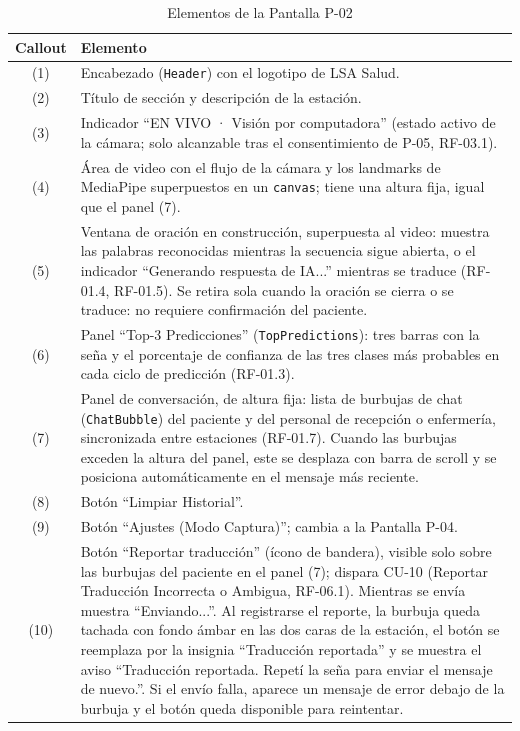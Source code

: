 \begin{table}[H]
    \centering
    \caption{Elementos de la Pantalla P-02}
    \label{tab:mock-p02}
    \begin{tabularx}{\textwidth}{c X}
        \toprule
        \textbf{Callout} & \textbf{Elemento} \\
        \midrule
        (1) & Encabezado (\texttt{Header}) con el logotipo de LSA Salud. \\
        (2) & Título de sección y descripción de la estación. \\
        (3) & Indicador ``EN VIVO · Visión por computadora'' (estado activo
        de la cámara; solo alcanzable tras el consentimiento de P-05, RF-03.1). \\
        (4) & Área de video con el flujo de la cámara y los landmarks
        de MediaPipe superpuestos en un \texttt{canvas}; tiene una altura
        fija, igual que el panel (7). \\
        (5) & Ventana de oración en construcción, superpuesta al video:
        muestra las palabras reconocidas mientras la secuencia sigue
        abierta, o el indicador ``Generando respuesta de IA...'' mientras
        se traduce (RF-01.4, RF-01.5). Se retira sola cuando la oración se
        cierra o se traduce: no requiere confirmación del paciente. \\
        (6) & Panel ``Top-3 Predicciones'' (\texttt{TopPredictions}): tres
        barras con la seña y el porcentaje de confianza de las tres clases
        más probables en cada ciclo de predicción (RF-01.3). \\
        (7) & Panel de conversación, de altura fija: lista de burbujas de chat
        (\texttt{ChatBubble}) del paciente y del personal de recepción o
        enfermería, sincronizada entre estaciones (RF-01.7). Cuando las
        burbujas exceden la altura del panel, este se desplaza con barra de
        scroll y se posiciona automáticamente en el mensaje más reciente. \\
        (8) & Botón ``Limpiar Historial''. \\
        (9) & Botón ``Ajustes (Modo Captura)''; cambia a la Pantalla P-04. \\
        (10) & Botón ``Reportar traducción'' (ícono de bandera), visible
        solo sobre las burbujas del paciente en el panel (7); dispara CU-10
        (Reportar Traducción Incorrecta o Ambigua, RF-06.1). Mientras se
        envía muestra ``Enviando...''. Al registrarse el reporte, la
        burbuja queda tachada con fondo ámbar en las dos caras de la
        estación, el botón se reemplaza por la insignia ``Traducción
        reportada'' y se muestra el aviso ``Traducción reportada. Repetí
        la seña para enviar el mensaje de nuevo.''. Si el envío falla,
        aparece un mensaje de error debajo de la burbuja y el botón queda
        disponible para reintentar. \\
        \bottomrule
    \end{tabularx}
\end{table}

